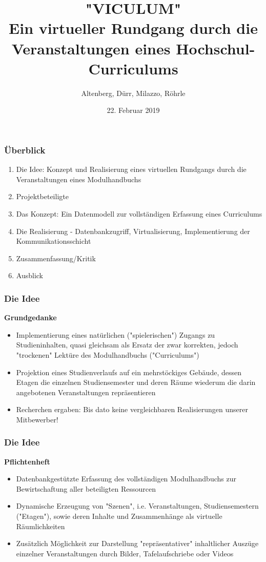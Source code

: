 \documentclass{beamer}
\title[Viculum]{"VICULUM" \\ Ein virtueller Rundgang durch die Veranstaltungen eines Hochschul-Curriculums } %
\author{Altenberg, Dürr, Milazzo, Röhrle}
\institute[]
{
Hochschule Albstadt-Sigmaringen \\ %
\medskip
\textit{Fabian Altenberg (WIN), altenbfa@hs-albsig.de} %
\newline
\textit{Maik Dürr (TI), duerrmai@hs-albsig.de} %
\newline
\textit{Domenico Milazzo (TI), milazzdo@hs-albsig.de} %
\newline
\textit{Prof. Dr. Jörg Röhrle, roehrle@hs-albsig.de} %
\newline
}
\date{22. Februar 2019} %
\begin{document}
\begin{frame}
\titlepage %
\end{frame}

\begin{frame}
\frametitle{Überblick}
\begin{enumerate}
\item Die Idee: Konzept und Realisierung eines virtuellen Rundgangs durch die Veranstaltungen eines Modulhandbuchs
\item Projektbeteiligte
\item Das Konzept: Ein Datenmodell zur vollständigen Erfassung eines Curriculums 
\item Die Realisierung - Datenbankzugriff, Virtualisierung, Implementierung der Kommunikationsschicht
\item Zusammenfassung/Kritik
\item Ausblick
\end{enumerate}
\end{frame}


\begin{frame}
\frametitle{Die Idee}
\textbf{Grundgedanke}
\begin{itemize}
\item Implementierung eines natürlichen ("spielerischen") Zugangs zu Studieninhalten, quasi gleichsam als Ersatz der zwar korrekten, jedoch "trockenen" Lektüre des Modulhandbuchs ("Curriculums")
\item Projektion eines Studienverlaufs auf ein mehrstöckiges Gebäude, dessen Etagen die einzelnen Studiensemester und deren Räume wiederum die darin angebotenen Veranstaltungen repräsentieren 
\item Recherchen ergaben:  Bis dato keine vergleichbaren Realisierungen unserer Mitbewerber!
\end{itemize}
\end{frame}


\begin{frame}
\frametitle{Die Idee}
\textbf{Pflichtenheft}
\begin{itemize}
\item Datenbankgestützte Erfassung des vollständigen Modulhandbuchs zur Bewirtschaftung aller beteiligten Ressourcen 
\item Dynamische Erzeugung von "Szenen", i.e. Veranstaltungen, Studiensemestern ("Etagen"), sowie deren Inhalte und  Zusammenhänge als virtuelle Räumlichkeiten 
\item Zusätzlich Möglichkeit zur Darstellung "repräsentativer" inhaltlicher Auszüge einzelner Veranstaltungen durch Bilder, Tafelaufschriebe oder Videos
\end{itemize}
\end{frame}
\end{document}
